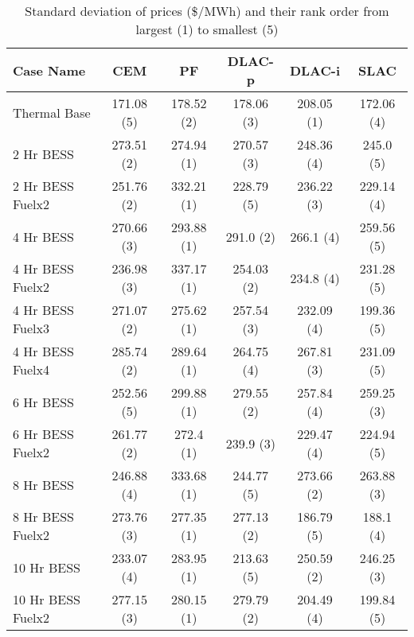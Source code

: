 \begin{table}[htp]
\centering
\begin{tabular}{lccccc}
\hline
\textbf{Case Name} & CEM & PF & DLAC-p & DLAC-i & SLAC \\
\hline
Thermal Base & 171.08 (5) & 178.52 (2) & 178.06 (3) & 208.05 (1) & 172.06 (4) \\
2 Hr BESS & 273.51 (2) & 274.94 (1) & 270.57 (3) & 248.36 (4) & 245.0 (5) \\
2 Hr BESS Fuelx2 & 251.76 (2) & 332.21 (1) & 228.79 (5) & 236.22 (3) & 229.14 (4) \\
4 Hr BESS & 270.66 (3) & 293.88 (1) & 291.0 (2) & 266.1 (4) & 259.56 (5) \\
4 Hr BESS Fuelx2 & 236.98 (3) & 337.17 (1) & 254.03 (2) & 234.8 (4) & 231.28 (5) \\
4 Hr BESS Fuelx3 & 271.07 (2) & 275.62 (1) & 257.54 (3) & 232.09 (4) & 199.36 (5) \\
4 Hr BESS Fuelx4 & 285.74 (2) & 289.64 (1) & 264.75 (4) & 267.81 (3) & 231.09 (5) \\
6 Hr BESS & 252.56 (5) & 299.88 (1) & 279.55 (2) & 257.84 (4) & 259.25 (3) \\
6 Hr BESS Fuelx2 & 261.77 (2) & 272.4 (1) & 239.9 (3) & 229.47 (4) & 224.94 (5) \\
8 Hr BESS & 246.88 (4) & 333.68 (1) & 244.77 (5) & 273.66 (2) & 263.88 (3) \\
8 Hr BESS Fuelx2 & 273.76 (3) & 277.35 (1) & 277.13 (2) & 186.79 (5) & 188.1 (4) \\
10 Hr BESS & 233.07 (4) & 283.95 (1) & 213.63 (5) & 250.59 (2) & 246.25 (3) \\
10 Hr BESS Fuelx2 & 277.15 (3) & 280.15 (1) & 279.79 (2) & 204.49 (4) & 199.84 (5) \\
\hline
\end{tabular}
\caption{Standard deviation of prices (\$/MWh) and their rank order from largest (1) to smallest (5)}
\label{tab:std_with_ranks}
\end{table}
